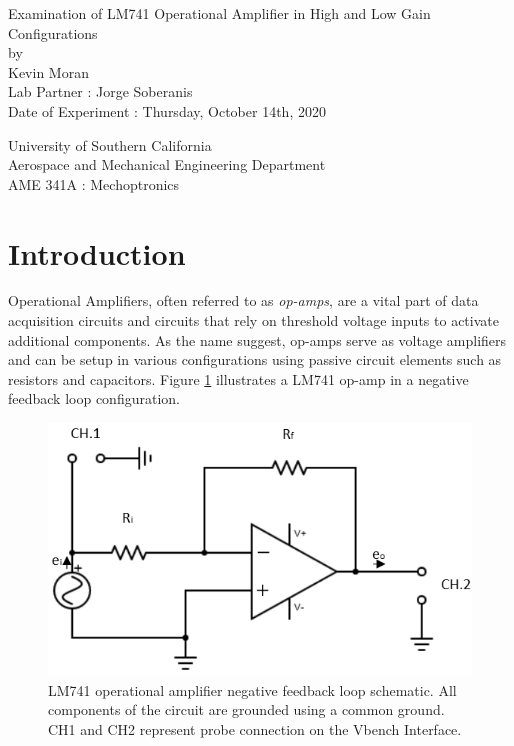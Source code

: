 \documentclass[letterpaper,12pt]{article}
\begin{document}
\begin{titlepage}
 \begin{center}
 \vspace*{1in}
{\Huge Examination of LM741 Operational Amplifier in High and Low Gain Configurations}\\
    \bigskip
    by\\
    \bigskip
    {\Large Kevin Moran} \\
    \bigskip
    Lab Partner : Jorge Soberanis\\
    Date of Experiment : Thursday, October 14th, 2020

    \bigskip\bigskip\bigskip
    University of Southern California\\
    Aerospace and Mechanical Engineering Department\\
    AME 341A : Mechoptronics
 \end{center}
\end{titlepage}




\section{Introduction}
Operational Amplifiers, often referred to as \textit{op-amps}, are a vital part of data acquisition circuits and circuits that rely on threshold voltage inputs to activate additional components. As the name suggest, op-amps serve as voltage amplifiers and can be setup in various configurations using passive circuit elements such as resistors and capacitors. Figure \ref{NFL} illustrates a LM741 op-amp in a negative feedback loop configuration.

\begin{figure}[ht]
    \centering
    \includegraphics[scale=1.25]{feedback.png}
    \caption{\small LM741 operational amplifier negative feedback loop schematic. All components of the circuit are grounded using a common ground. CH1 and CH2 represent probe connection on the Vbench Interface.}
    \label{NFL}
\end{figure}
\end{document}
